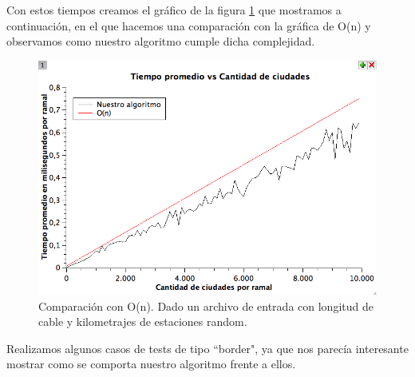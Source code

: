 Con estos tiempos creamos el gráfico de la figura \ref{ej1-tiempo-vs-cant-ciudades-random} que mostramos a continuación, en el que hacemos una comparación con la gráfica de O(n) y observamos como nuestro algoritmo cumple dicha complejidad.

\begin{figure}[H]
\begin{center}

  \includegraphics[width=\linewidth]{../graficos/ej1/TIempoPromedioVsCantidadCIudades.png}
  \caption{{\small Comparación con O(n). Dado un archivo de entrada con longitud de cable y kilometrajes de estaciones random.}} \label{ej1-tiempo-vs-cant-ciudades-random}
\endminipage

\end{center}
\end{figure}

Realizamos algunos casos de tests de tipo ``border", ya que nos parecía interesante mostrar como se comporta nuestro algoritmo frente a ellos.\\






